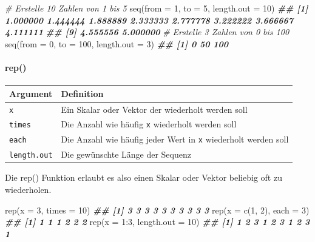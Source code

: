 \documentclass[
]{article}
\newenvironment{Shaded}{\begin{snugshade}}{\end{snugshade}}
\newcommand{\AttributeTok}[1]{\textcolor[rgb]{0.77,0.63,0.00}{#1}}
\newcommand{\CommentTok}[1]{\textcolor[rgb]{0.56,0.35,0.01}{\textit{#1}}}
\newcommand{\DecValTok}[1]{\textcolor[rgb]{0.00,0.00,0.81}{#1}}
\newcommand{\DocumentationTok}[1]{\textcolor[rgb]{0.56,0.35,0.01}{\textbf{\textit{#1}}}}
\newcommand{\FunctionTok}[1]{\textcolor[rgb]{0.00,0.00,0.00}{#1}}
\newcommand{\NormalTok}[1]{#1}
\newcommand{\SpecialCharTok}[1]{\textcolor[rgb]{0.00,0.00,0.00}{#1}}
\begin{document}
\begin{Shaded}
\begin{Highlighting}[]
\CommentTok{\# Erstelle 10 Zahlen von 1 bis 5}
\FunctionTok{seq}\NormalTok{(}\AttributeTok{from =} \DecValTok{1}\NormalTok{, }\AttributeTok{to =} \DecValTok{5}\NormalTok{, }\AttributeTok{length.out =} \DecValTok{10}\NormalTok{)}
\DocumentationTok{\#\#  [1] 1.000000 1.444444 1.888889 2.333333 2.777778 3.222222 3.666667 4.111111}
\DocumentationTok{\#\#  [9] 4.555556 5.000000}
\CommentTok{\# Erstelle 3 Zahlen von 0 bis 100}
\FunctionTok{seq}\NormalTok{(}\AttributeTok{from =} \DecValTok{0}\NormalTok{, }\AttributeTok{to =} \DecValTok{100}\NormalTok{, }\AttributeTok{length.out =} \DecValTok{3}\NormalTok{)}
\DocumentationTok{\#\# [1]   0  50 100}
\end{Highlighting}
\end{Shaded}

\hypertarget{rep}{%
\paragraph{rep()}\label{rep}}

\begin{longtable}[]{@{}ll@{}}
\toprule
Argument & Definition \\
\midrule
\endhead
\texttt{x} & Ein Skalar oder Vektor der wiederholt werden soll \\
\texttt{times} & Die Anzahl wie häufig \texttt{x} wiederholt werden soll \\
\texttt{each} & Die Anzahl wie häufig jeder Wert in \texttt{x} wiederholt werden soll \\
\texttt{length.out} & Die gewünschte Länge der Sequenz \\
\bottomrule
\end{longtable}

Die rep() Funktion erlaubt es also einen Skalar oder Vektor beliebig oft zu wiederholen.

\begin{Shaded}
\begin{Highlighting}[]
\FunctionTok{rep}\NormalTok{(}\AttributeTok{x =} \DecValTok{3}\NormalTok{, }\AttributeTok{times =} \DecValTok{10}\NormalTok{)}
\DocumentationTok{\#\#  [1] 3 3 3 3 3 3 3 3 3 3}
\FunctionTok{rep}\NormalTok{(}\AttributeTok{x =} \FunctionTok{c}\NormalTok{(}\DecValTok{1}\NormalTok{, }\DecValTok{2}\NormalTok{), }\AttributeTok{each =} \DecValTok{3}\NormalTok{)}
\DocumentationTok{\#\# [1] 1 1 1 2 2 2}
\FunctionTok{rep}\NormalTok{(}\AttributeTok{x =} \DecValTok{1}\SpecialCharTok{:}\DecValTok{3}\NormalTok{, }\AttributeTok{length.out =} \DecValTok{10}\NormalTok{)}
\DocumentationTok{\#\#  [1] 1 2 3 1 2 3 1 2 3 1}
\end{Highlighting}
\end{Shaded}
\end{document}
